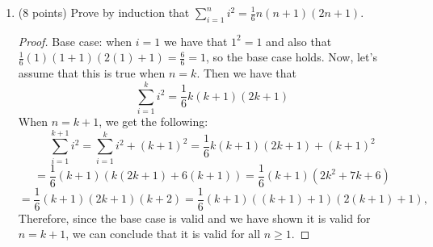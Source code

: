 \documentclass[11pt]{article}
\begin{document}
\begin{enumerate}
\begin{enumerate}
\end{enumerate}

\newpage

\item (8 points) Prove by induction that $\sum_{i=1}^ni^2=\frac{1}{6}n(n+1)(2n+1)$.

\begin{proof}

Base case: when $i = 1$ we have that $1^2 = 1$ and also that $\frac{1}{6}(1)(1+1)(2(1)+1) = \frac{6}{6} = 1$, so the base case holds.  
Now, let's assume that this is true when $n=k$.  Then we have that
$$ \sum_{i=1}^{k} i^2 = \frac{1}{6}k(k+1)(2k+1) $$
When $n = k + 1$, we get the following:
$$ \sum_{i=1}^{k+1} i^2 = \sum_{i=1}^{k} i^2 + (k+1)^2 = \frac{1}{6}k(k+1)(2k+1) + (k+1)^2$$
$$ = \frac{1}{6}(k+1)(k(2k+1)+6(k+1)) = \frac{1}{6}(k+1)(2k^2+7k+6) $$
$$ = \frac{1}{6}(k+1)(2k+1)(k+2) = \frac{1}{6}(k+1)((k+1)+1)(2(k+1)+1), $$
Therefore, since the base case is valid and we have shown it is valid for $n=k+1$, we can conclude that it is valid for all $n \geq 1$.  

\end{proof}

\end{enumerate}
\end{document}
